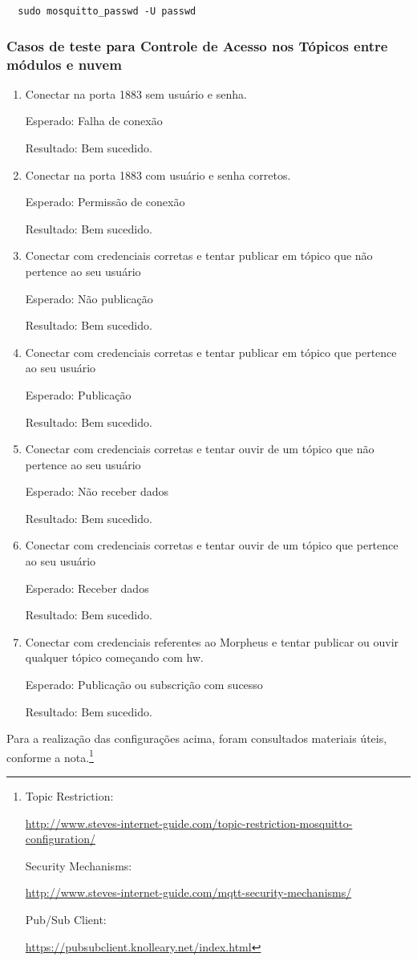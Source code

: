 \begin{lstlisting}
  sudo mosquitto_passwd -U passwd
\end{lstlisting}

\subsubsection{Casos de teste para Controle de Acesso nos Tópicos \wmqtt{} entre módulos e nuvem}
\begin{enumerate}
\item
Conectar na porta 1883 sem usuário e senha.

Esperado: Falha de conexão

Resultado: Bem sucedido.
\item Conectar na porta 1883 com usuário e senha corretos.

Esperado: Permissão de conexão

Resultado: Bem sucedido.
\item
Conectar com credenciais corretas e tentar publicar em tópico que não pertence ao seu usuário

Esperado: Não publicação

Resultado: Bem sucedido.
\item
Conectar com credenciais corretas e tentar publicar em tópico que pertence ao seu usuário

Esperado: Publicação

Resultado: Bem sucedido.
\item
Conectar com credenciais corretas e tentar ouvir de um tópico que não pertence ao seu usuário

Esperado: Não receber dados

Resultado: Bem sucedido.
\item
Conectar com credenciais corretas e tentar ouvir de um tópico que pertence ao seu usuário

Esperado: Receber dados

Resultado: Bem sucedido.

\item
Conectar com credenciais referentes ao Morpheus e tentar publicar ou ouvir qualquer tópico começando com hw.

Esperado: Publicação ou subscrição com sucesso

Resultado: Bem sucedido.
\end{enumerate}

Para a realização das configurações acima, foram consultados materiais úteis, conforme a nota.\footnote{Topic Restriction:

\url{http://www.steves-internet-guide.com/topic-restriction-mosquitto-configuration/}

Security Mechanisms:

\url{http://www.steves-internet-guide.com/mqtt-security-mechanisms/}

Pub/Sub Client:

\url{https://pubsubclient.knolleary.net/index.html}}
